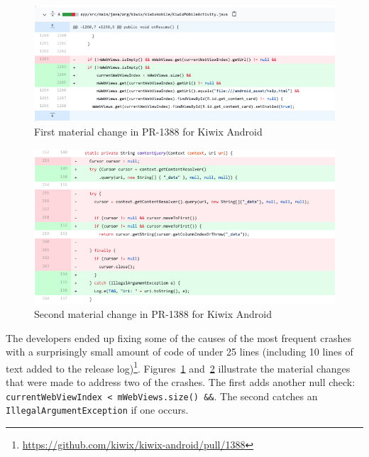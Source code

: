 \begin{figure}
    \centering
    \includegraphics[width=14cm]{images/github/kiwix-pr1388-extract-1.png}
    \caption{First material change in PR-1388 for Kiwix Android}
    \label{fig:kiwix_pr1388_extract_1}
\end{figure}


\begin{figure}
    \centering
    \includegraphics[width=14cm]{images/github/kiwix-pr1388-extract-2.png}
    \caption{Second material change in PR-1388 for Kiwix Android}
    \label{fig:kiwix_pr1388_extract_2}
\end{figure}


The developers ended up fixing some of the causes of the most frequent crashes with a surprisingly small amount of code of under 25 lines (including 10 lines of text added to the release log)\footnote{\url{https://github.com/kiwix/kiwix-android/pull/1388}}. Figures~\ref{fig:kiwix_pr1388_extract_1} and~\ref{fig:kiwix_pr1388_extract_2} illustrate the material changes that were made to address two of the crashes. The first adds another null check: \small{\texttt{currentWebViewIndex < mWebViews.size() \&\&}}. 
The second catches an \texttt{IllegalArgumentException} if one occurs. 

